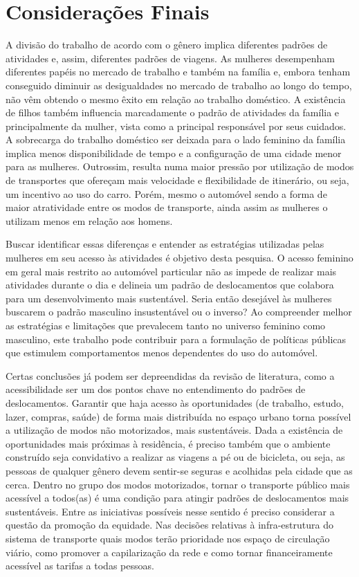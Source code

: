 \chapter{Considerações Finais}\label{chap:considfinais}


A divisão do trabalho de acordo com o gênero implica diferentes padrões de atividades e, assim, diferentes padrões de viagens. As mulheres desempenham diferentes papéis no mercado de trabalho e também na família e, embora tenham conseguido diminuir as desigualdades no mercado de trabalho ao longo do tempo, não vêm obtendo o mesmo êxito em relação ao trabalho doméstico. A existência de filhos também influencia marcadamente o padrão de atividades da família e principalmente da mulher, vista como a principal responsável por seus cuidados. A sobrecarga do trabalho doméstico ser deixada para o lado feminino da família implica menos disponibilidade de tempo e a configuração de uma cidade menor para as mulheres. Outrossim, resulta numa maior pressão por utilização de modos de transportes que ofereçam mais velocidade e flexibilidade de itinerário, ou seja, um incentivo ao uso do carro.
Porém, mesmo o automóvel sendo a forma de maior atratividade entre os modos de transporte, ainda assim as mulheres o utilizam menos em relação aos homens.

Buscar identificar essas diferenças e entender as estratégias utilizadas pelas mulheres em seu acesso às atividades é objetivo desta pesquisa. O acesso feminino em geral mais restrito ao automóvel particular não as impede de realizar mais atividades durante o dia e delineia um padrão de deslocamentos que colabora para um desenvolvimento mais sustentável. Seria então desejável às mulheres buscarem o padrão masculino insustentável ou o inverso? Ao compreender melhor as estratégias e limitações que prevalecem tanto no universo feminino como masculino, este trabalho pode contribuir para a formulação de políticas públicas que estimulem comportamentos menos dependentes do uso do automóvel.

Certas conclusões já podem ser depreendidas da revisão de literatura, como a acessibilidade ser um dos pontos chave no entendimento do padrões de deslocamentos. Garantir que haja acesso às oportunidades (de trabalho, estudo, lazer, compras, saúde) de forma mais distribuída no espaço urbano torna possível a utilização de modos não motorizados, mais sustentáveis. Dada a existência de oportunidades mais próximas à residência, é preciso também que o ambiente construído seja convidativo a realizar as viagens a pé ou de bicicleta, ou seja, as pessoas de qualquer gênero devem sentir-se seguras e acolhidas pela cidade que as cerca. 
Dentro no grupo dos modos motorizados, tornar o transporte público mais acessível a todos(as) é uma condição para atingir padrões de deslocamentos mais sustentáveis. Entre as iniciativas possíveis nesse sentido é preciso considerar a questão da promoção da equidade. Nas decisões relativas à infra-estrutura do sistema de transporte quais modos terão prioridade nos espaço de circulação viário, como promover a capilarização da rede e como tornar financeiramente acessível as tarifas a todas pessoas.

